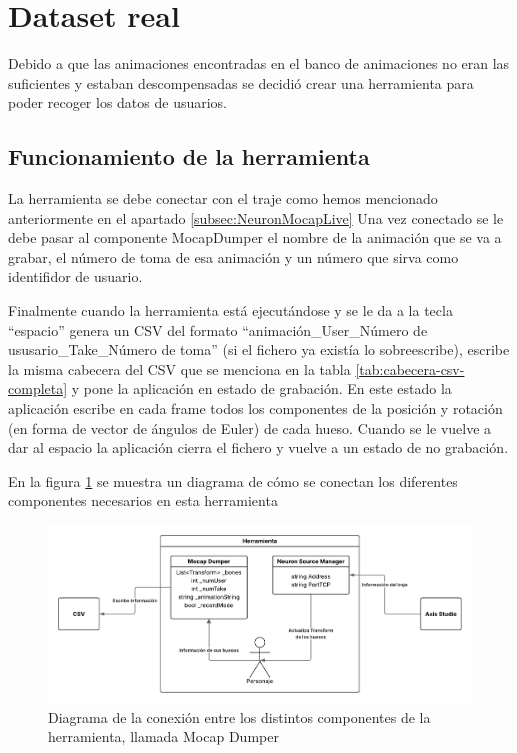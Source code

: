 \section{Dataset real}
\label{sec:datasetReal}
Debido a que las animaciones encontradas en el banco de animaciones no eran las suficientes y estaban descompensadas se decidió crear una herramienta para poder recoger los datos de usuarios.

\subsection{Funcionamiento de la herramienta}
La herramienta se debe conectar con el traje como hemos mencionado anteriormente en el apartado \ref{subsec:NeuronMocapLive}
Una vez conectado se le debe pasar al componente MocapDumper el nombre de la animación que se va a grabar, el número de toma de esa animación y un número que sirva como identifidor de usuario.

Finalmente cuando la herramienta está ejecutándose y se le da a la tecla ``espacio'' genera un CSV del formato ``animación\_User\_Número de ususario\_Take\_Número de toma'' (si el fichero ya existía lo sobreescribe), escribe la misma cabecera del CSV que se menciona en la tabla \ref{tab:cabecera-csv-completa} y pone la aplicación en estado de grabación.
En este estado la aplicación escribe en cada frame todos los componentes de la posición y rotación (en forma de vector de ángulos de Euler) de cada hueso.
Cuando se le vuelve a dar al espacio la aplicación cierra el fichero y vuelve a un estado de no grabación.

En la figura \ref{fig:MocapDumper} se muestra un diagrama de cómo se conectan los diferentes componentes necesarios en esta herramienta

\begin{figure}[H]
	\centering
	\includegraphics[width=1\textwidth]{Imagenes/Vectorial/MocapDumper.pdf}
	\caption{Diagrama de la conexión entre los distintos componentes de la herramienta, llamada Mocap Dumper}
	\label{fig:MocapDumper}
\end{figure}

